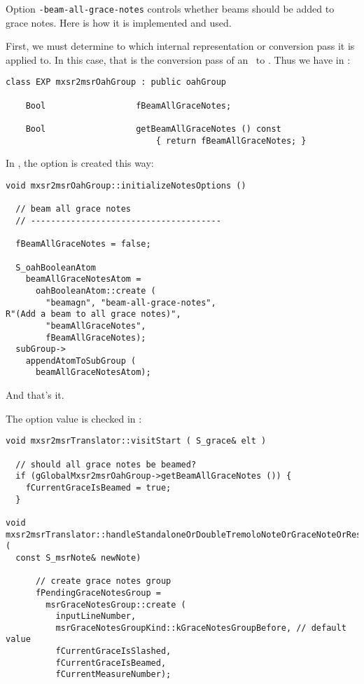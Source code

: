 {Option {\tt -beam-all-grace-notes} controls whether beams should be added to grace notes. Here is how it is implemented and used.

First, we must determine to which internal representation or conversion pass it is applied to. In this case, that is the conversion pass of an \mxsrRepr\ to \msrRepr.
Thus we have in :
\begin{lstlisting}[language=CPlusPlus]
class EXP mxsr2msrOahGroup : public oahGroup

    Bool                  fBeamAllGraceNotes;

    Bool                  getBeamAllGraceNotes () const
                              { return fBeamAllGraceNotes; }
\end{lstlisting}

In , the option is created this way:
\begin{lstlisting}[language=CPlusPlus]
void mxsr2msrOahGroup::initializeNotesOptions ()

  // beam all grace notes
  // --------------------------------------

  fBeamAllGraceNotes = false;

  S_oahBooleanAtom
    beamAllGraceNotesAtom =
      oahBooleanAtom::create (
        "beamagn", "beam-all-grace-notes",
R"(Add a beam to all grace notes)",
        "beamAllGraceNotes",
        fBeamAllGraceNotes);
  subGroup->
    appendAtomToSubGroup (
      beamAllGraceNotesAtom);
\end{lstlisting}

And that's it.

The option value is checked in :
\begin{lstlisting}[language=CPlusPlus]
void mxsr2msrTranslator::visitStart ( S_grace& elt )

  // should all grace notes be beamed?
  if (gGlobalMxsr2msrOahGroup->getBeamAllGraceNotes ()) {
    fCurrentGraceIsBeamed = true;
  }

void mxsr2msrTranslator::handleStandaloneOrDoubleTremoloNoteOrGraceNoteOrRest (
  const S_msrNote& newNote)

      // create grace notes group
      fPendingGraceNotesGroup =
        msrGraceNotesGroup::create (
          inputLineNumber,
          msrGraceNotesGroupKind::kGraceNotesGroupBefore, // default value
          fCurrentGraceIsSlashed,
          fCurrentGraceIsBeamed,
          fCurrentMeasureNumber);


\end{lstlisting}}
